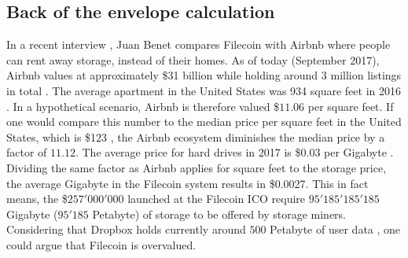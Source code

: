 \documentclass[conference]{IEEEtran}
\begin{document}
\subsection{Back of the envelope calculation}

In a recent interview \cite{podcast}, Juan Benet compares Filecoin with Airbnb \cite{airbnb} where people can rent away storage, instead of their homes.
As of today (September 2017), Airbnb values at approximately \$31 billion while holding around 3 million listings in total \cite{airbnb-valuation}.
The average apartment in the United States was 934 square feet in 2016 \cite{housing-cnbc}.
In a hypothetical scenario, Airbnb is therefore valued \$$11.06$ per square feet. 
If one would compare this number to the median price per square feet in the United States, which is \$123 \cite{home-prices}, the Airbnb ecosystem diminishes the median price by a factor of $11.12$.
The average price for hard drives in 2017 is \$0.03 per Gigabyte \cite{hard-drive}.
Dividing the same factor as Airbnb applies for square feet to the storage price, the average Gigabyte in the Filecoin system results in \$0.0027.
This in fact means, the \$$257'000'000$ launched at the Filecoin ICO require $95'185'185'185$ Gigabyte ($95'185$ Petabyte) of storage to be offered by storage miners.
Considering that Dropbox \cite{dropbox} holds currently around $500$ Petabyte of user data \cite{dropbox-userdata}, one could argue that Filecoin is overvalued.


\ifCLASSOPTIONcaptionsoff
  \newpage
\fi


\end{document}

